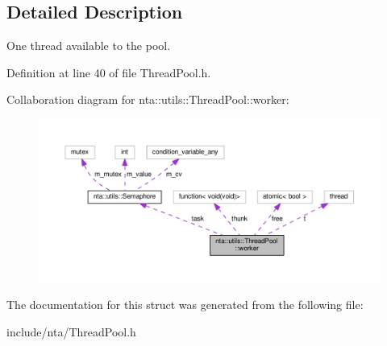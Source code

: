 \subsection{Detailed Description}
One thread available to the pool. 

Definition at line 40 of file Thread\+Pool.\+h.



Collaboration diagram for nta\+:\+:utils\+:\+:Thread\+Pool\+:\+:worker\+:
\nopagebreak
\begin{figure}[H]
\begin{center}
\leavevmode
\includegraphics[width=350pt]{da/d21/structnta_1_1utils_1_1ThreadPool_1_1worker__coll__graph}
\end{center}
\end{figure}


The documentation for this struct was generated from the following file\+:\begin{DoxyCompactItemize}
\item 
include/nta/Thread\+Pool.\+h\end{DoxyCompactItemize}
